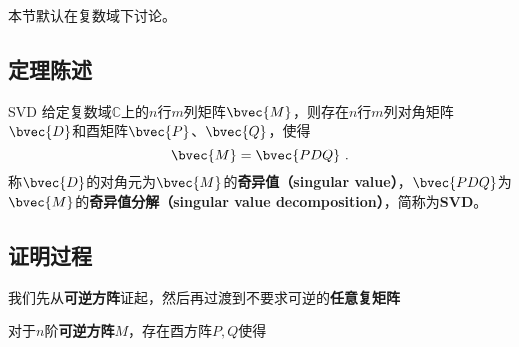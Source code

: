 


本节默认在复数域下讨论。
\subsection{定理陈述}
\begin{theorem}{SVD}
给定复数域$\mathbb{C}$上的$n$行$m$列矩阵$\bvec{M}$，则存在$n$行$m$列对角矩阵$\bvec{D}$和酉矩阵$\bvec{P}$、$\bvec{Q}$，使得
\begin{equation}
\bvec{M} = \bvec{PDQ}~. 
\end{equation}
称$\bvec{D}$的对角元为$\bvec{M}$的\textbf{奇异值（singular value）}，$\bvec{PDQ}$为$\bvec{M}$的\textbf{奇异值分解（singular value decomposition）}，简称为\textbf{SVD}。
\end{theorem}


\subsection{证明过程}
我们先从\textbf{可逆方阵}证起，然后再过渡到不要求可逆的\textbf{任意复矩阵}
\begin{theorem}{}
对于$n$阶\textbf{可逆方阵}$M$，存在酉方阵$P,Q$使得
\begin{equation}

\end{equation}

\end{theorem}




















